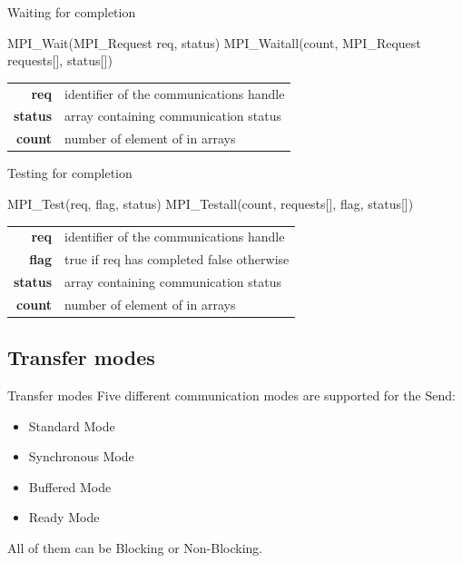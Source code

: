 \documentclass[aspectratio=43]{beamer}
\begin{document}
\begin{frame}[fragile]{Waiting for completion}
\begin{Pseudolisting}[]{}
MPI_Wait(MPI_Request req, status)
MPI_Waitall(count, MPI_Request requests[], status[])
\end{Pseudolisting}
\begin{black1block}{}
\begin{tabular}{rl}
    \textbf{req} & identifier of the communications handle\\
    \textbf{status} & array containing communication status\\
    \textbf{count} & number of element of in arrays\\
\end{tabular}
\end{black1block}
\end{frame}

\begin{frame}[fragile]{Testing for completion}
\begin{Pseudolisting}[]{}
MPI_Test(req, flag, status)
MPI_Testall(count, requests[], flag, status[])
\end{Pseudolisting}
\begin{black1block}{}
\begin{tabular}{rl}
    \textbf{req} & identifier of the communications handle\\
    \textbf{flag} & true if req has completed false otherwise\\
    \textbf{status} & array containing communication status\\
    \textbf{count} & number of element of in arrays\\
\end{tabular}
\end{black1block}
\end{frame}

\subsection{Transfer modes}
\begin{frame}{Transfer modes}
Five different communication modes are supported for the Send:
\begin{itemize}
    \item Standard Mode
    \item Synchronous Mode
    \item Buffered Mode
    \item Ready Mode
\end{itemize}
All of them can be Blocking or Non-Blocking.
\end{frame}
\end{document}
